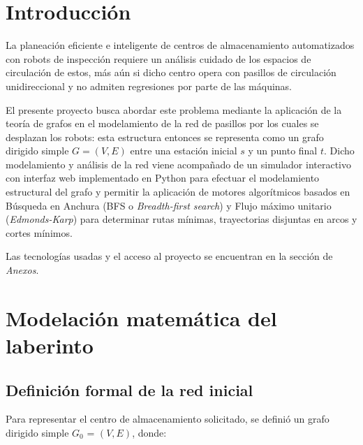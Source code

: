 \documentclass[12pt,a4paper]{article}
\begin{document}
\setcounter{page}{1}

\section{Introducción}\label{introducciuxf3n}

La planeación eficiente e inteligente de centros de almacenamiento automatizados con robots de inspección requiere un análisis cuidado de los espacios de circulación de estos, más aún si dicho centro opera con pasillos de circulación unidireccional y no admiten regresiones por parte de las máquinas.

El presente proyecto busca abordar este problema mediante la aplicación de la teoría de grafos en el modelamiento de la red de pasillos por los cuales se desplazan los robots: esta estructura entonces se representa como un grafo dirigido simple \(G=(V,E)\) entre una estación inicial \(s\) y un punto final \(t\). Dicho modelamiento y análisis de la red viene acompañado de un simulador interactivo con interfaz web implementado en Python para efectuar el modelamiento estructural del grafo y permitir la aplicación de motores algorítmicos basados en Búsqueda en Anchura (BFS o \emph{Breadth-first search}) y Flujo máximo unitario (\emph{Edmonds-Karp}) para determinar rutas mínimas, trayectorias disjuntas en arcos y cortes mínimos.

Las tecnologías usadas y el acceso al proyecto se encuentran en la sección de \emph{Anexos}.

\section{Modelación matemática del laberinto}\label{modelaciuxf3n-matemuxe1tica-del-laberinto}

\subsection{Definición formal de la red inicial}\label{definiciuxf3n-formal-de-la-red-inicial}

Para representar el centro de almacenamiento solicitado, se definió un grafo dirigido simple \(G_0\) = \((V,E)\), donde:
\end{document}
